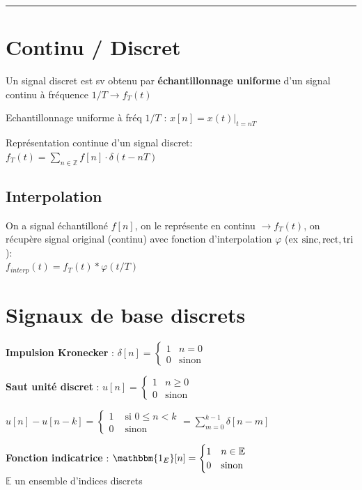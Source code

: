 \rule{\linewidth}{1.0pt}


\section{Continu / Discret}

Un signal discret est sv obtenu par \textbf{échantillonnage uniforme} d'un signal continu à fréquence $1/T \rightarrow f_T(t)$

Echantillonnage uniforme à fréq $1/T$ : $x[n] = x(t)|_{t=nT}$

Représentation continue d'un signal discret: \\
$f_T(t) = \sum_{n\in \mathbb{Z}} f[n] \cdot \delta(t-nT)$

\subsection*{Interpolation}

On a signal échantilloné $f[n]$, on le représente en continu $\rightarrow f_T(t)$, on récupère signal original (continu) avec fonction d'interpolation $\varphi$ (ex $\operatorname{sinc}, \text{rect}, \text{tri}$): \\
$f_{interp}(t) = f_T(t) * \varphi(t/T)$


\section{Signaux de base discrets}

\textbf{Impulsion Kronecker} : $\delta[n] = \begin{cases} 1 & n = 0 \\0 & \text{sinon} \end{cases}$

\textbf{Saut unité discret} : $u[n] = \begin{cases} 1 & n\geq 0 \\0 & \text{sinon} \end{cases}$

$
    u[n]-u[n-k] = \begin{cases}1 &\text{ si } 0\leq n < k\\0 &\text{ sinon}\end{cases} = \sum_{m=0}^{k-1}\delta[n-m]
$

\textbf{Fonction indicatrice} : $\mathbbm{1_E} [n] = \begin{cases} 1 & n\in \mathbb{E} \\0 & \text{sinon} \end{cases}$ \\
$\mathbb{E}$ un ensemble d'indices discrets

